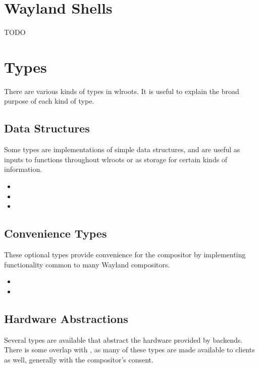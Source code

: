 \documentclass{article}
\begin{document}
\newpage
\section{Wayland Shells}\label{shells}

TODO

\newpage
\section{Types}\label{types}

There are various kinds of types in wlroots. It is useful to explain the broad
purpose of each kind of type.

\subsection{Data Structures}\label{data structures}

Some types are implementations of simple data structures, and are useful as
inputs to functions throughout wlroots or as storage for certain kinds of
information.

\begin{itemize}
    \itemsep0em
    \item {}
    \item {}
    \item {}
\end{itemize}

\subsection{Convenience Types}\label{convenience types}

These optional types provide convenience for the compositor by implementing
functionality common to many Wayland compositors.

\begin{itemize}
    \itemsep0em
    \item {}
    \item {}
\end{itemize}

\subsection{Hardware Abstractions}\label{hardware abstractions}

Several types are available that abstract the hardware provided by backends.
There is some overlap with , as many of these types
are made available to clients as well, generally with the compositor's consent.
\end{document}
